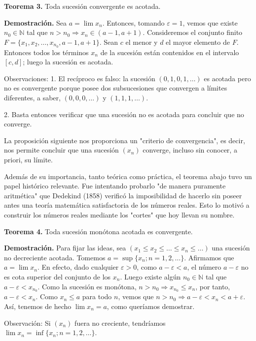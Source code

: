 \documentclass[12pt,oneside]{book}
\begin{document}
\textbf{Teorema 3.} Toda sucesión convergente es acotada.

\textbf{Demostración.} Sea \(a = \lim x_n\). Entonces, tomando \(\varepsilon = 1\), vemos que existe \(n_0 \in \mathbb{N}\) tal que \(n > n_0 \Rightarrow x_n \in (a - 1, a + 1)\). Consideremos el conjunto finito \(F = \{x_1, x_2, \dots, x_{n_0}, a - 1, a + 1\}\). Sean \(c\) el menor y \(d\) el mayor elemento de \(F\). Entonces todos los términos \(x_n\) de la sucesión están contenidos en el intervalo \([c, d]\); luego la sucesión es acotada.

Observaciones: 1. El recíproco es falso: la sucesión \((0, 1, 0, 1, \dots)\) es acotada pero no es convergente porque posee dos subsucesiones que convergen a límites diferentes, a saber, \((0, 0, 0, \dots)\) y \((1, 1, 1, \dots)\).

2. Basta entonces verificar que una sucesión no es acotada para concluir que no converge.

La proposición siguiente nos proporciona un "criterio de convergencia", es decir, nos permite concluir que una sucesión \((x_n)\) converge, incluso sin conocer, a priori, su límite.

Además de su importancia, tanto teórica como práctica, el teorema abajo tuvo un papel histórico relevante. Fue intentando probarlo "de manera puramente aritmética" que Dedekind (1858) verificó la imposibilidad de hacerlo sin poseer antes una teoría matemática satisfactoria de los números reales. Esto lo motivó a construir los números reales mediante los "cortes" que hoy llevan su nombre.

\textbf{Teorema 4.} Toda sucesión monótona acotada es convergente.

\textbf{Demostración.} Para fijar las ideas, sea \((x_1 \le x_2 \le \dots \le x_n \le \dots)\) una sucesión no decreciente acotada. Tomemos \(a = \sup \{x_n; n = 1, 2, \dots\}\). Afirmamos que \(a = \lim x_n\). En efecto, dado cualquier \(\varepsilon > 0\), como \(a - \varepsilon < a\), el número \(a - \varepsilon\) no es cota superior del conjunto de los \(x_n\). Luego existe algún \(n_0 \in \mathbb{N}\) tal que \(a - \varepsilon < x_{n_0}\). Como la sucesión es monótona, \(n > n_0 \Rightarrow x_{n_0} \leq x_n\), por tanto, \(a - \varepsilon < x_n\). Como \(x_n \leq a\) para todo \(n\), vemos que \(n > n_0 \Rightarrow a - \varepsilon < x_n < a + \varepsilon\). Así, tenemos de hecho \(\lim x_n = a\), como queríamos demostrar.

Observación: Si \((x_n)\) fuera no creciente, tendríamos \(\lim x_n = \inf \{x_n; n = 1, 2, \dots\}\).
\end{document}

